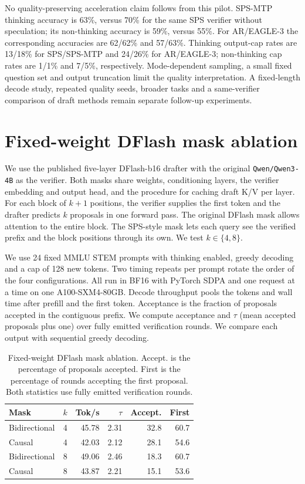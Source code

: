 No quality-preserving acceleration claim follows from this pilot. SPS-MTP thinking accuracy is 63\%, versus 70\% for the same SPS verifier without speculation; its non-thinking accuracy is 59\%, versus 55\%. For AR/EAGLE-3 the corresponding accuracies are 62/62\% and 57/63\%. Thinking output-cap rates are 13/18\% for SPS/SPS-MTP and 24/26\% for AR/EAGLE-3; non-thinking cap rates are 1/1\% and 7/5\%, respectively. Mode-dependent sampling, a small fixed question set and output truncation limit the quality interpretation. A fixed-length decode study, repeated quality seeds, broader tasks and a same-verifier comparison of draft methods remain separate follow-up experiments.

\section{Fixed-weight DFlash mask ablation}\label{app:dflash-mask}
We use the published five-layer DFlash-b16 drafter \citep{chen2026dflash} with
the original \texttt{Qwen/Qwen3-4B} as the verifier. Both masks share
weights, conditioning layers, the verifier embedding and output head,
and the procedure for caching draft K/V per layer. For each block of $k+1$ positions, the verifier supplies
the first token and the drafter predicts $k$ proposals in one forward pass.
The original DFlash mask allows attention to the entire block. The
SPS-style mask lets each query see the verified prefix and the
block positions through its own. We test $k\in\{4,8\}$.

We use 24 fixed MMLU STEM prompts with thinking enabled, greedy decoding
and a cap of 128 new tokens. Two timing repeats per prompt rotate the order
of the four configurations. All run in BF16 with PyTorch SDPA and one
request at a time on one A100-SXM4-80GB. Decode throughput pools the tokens
and wall time after prefill and the first token. Acceptance is the fraction
of proposals accepted in the contiguous prefix. We compute acceptance and
$\tau$ (mean accepted proposals plus one) over fully emitted verification
rounds. We compare each output with sequential greedy decoding.

\begin{table}[t]
\centering
\small
\setlength{\tabcolsep}{4pt}
\begin{tabular}{lrrrrr}
\toprule
Mask & $k$ & Tok/s & $\tau$ & Accept. & First \\
\midrule
Bidirectional & 4 & 45.78 & 2.31 & 32.8 & 60.7 \\
Causal & 4 & 42.03 & 2.12 & 28.1 & 54.6 \\
\addlinespace
Bidirectional & 8 & 49.06 & 2.46 & 18.3 & 60.7 \\
Causal & 8 & 43.87 & 2.21 & 15.1 & 53.6 \\
\bottomrule
\end{tabular}
\caption{Fixed-weight DFlash mask ablation. Accept. is the percentage of
proposals accepted. First is the percentage of rounds accepting the first
proposal. Both statistics use fully emitted verification rounds.}
\label{tab:dflash-mask}
\end{table}

